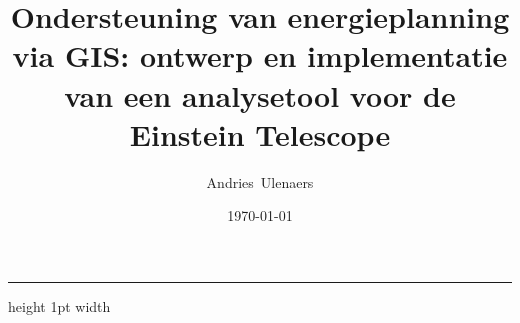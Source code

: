 \documentclass[a0,portrait]{hogent-poster}
\title{Ondersteuning van energieplanning via GIS: ontwerp en implementatie van een analysetool voor de Einstein Telescope}
\author{Andries\ Ulenaers}
\date{\today}
\begin{document}
\maketitle


{\color{black}\hrule height 1pt width \hsize}
\end{document}
